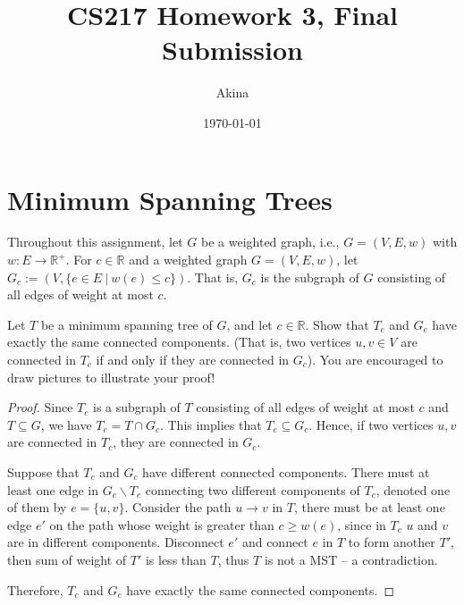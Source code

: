 \documentclass[11pt,a4paper,oneside]{article}
\newcommand{\R}{\mathbb{R}}
\renewcommand{\hwtitle} {CS217 Homework 3, Final Submission}
\renewcommand{\hwauthor}{Akina}
\renewcommand{\hwdate}{\today}
\begin{document}
\title{\hwtitle}
\author{\hwauthor}
\date{\hwdate}
\maketitle

\section*{Minimum Spanning Trees}

Throughout this assignment, let $G$ be a weighted graph, i.e., $G=(V,E,w)$ 
with $w: E \rightarrow \R^+$.
For $c \in \R$ and a weighted graph $G = (V,E,w)$, let
$G_c := (V, \{e \in E \ | \ w(e) \leq c\})$. That is, $G_c$ is the
subgraph of $G$ consisting of all edges of weight at most $c$.

\begin{problem}{1}
	\statement
	Let $T$ be a minimum spanning tree of $G$, and let $c \in \R$.  Show that
	$T_c$ and $G_c$ have exactly the same connected components.  (That
	is, two vertices $u,v \in V$ are connected in $T_c$ if and only if
	they are connected in $G_c$).
	You are encouraged to draw pictures to illustrate your proof!
	\solution
	
	\begin{proof}
		Since \(T_c\) is a subgraph of \(T\) consisting of all edges of weight at most \(c\) and \(T \subseteq G\), we have  \(T_c = T \cap G_c\). This implies that \(T_c \subseteq G_c\). Hence, if two vertices \(u, v\) are connected in \(T_c\), they are connected in \(G_c\). 
		
		Suppose that \(T_c\) and \(G_c\) have different connected components. There must at least one edge in $G_c \backslash T_c$ connecting two different components of \(T_c\), denoted one of them by \(e = \{u, v\}\). Consider the path $u \rightarrow v$ in $T$, there must be at least one edge $e'$ on the path whose weight is greater than $c \geq w(e)$, since in $T_c$ $u$ and $v$ are in different components. Disconnect \(e'\) and connect \(e\) in $T$ to form another $T'$, then sum of weight of $T'$ is less than $T$, thus $T$ is not a MST -- a contradiction.
		
		Therefore, \(T_c\) and \(G_c\) have exactly the same connected components.
	\end{proof}
\end{problem}
\end{document}
